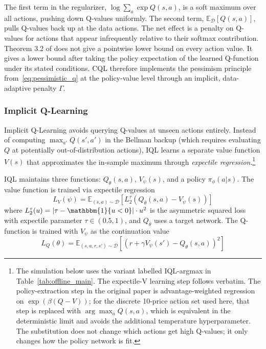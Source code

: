 The first term in the regularizer, $\log \sum_a \exp Q(s,a)$, is a soft maximum over all actions, pushing down Q-values uniformly. The second term, $\mathbb{E}_{\mathcal{D}}[Q(s,a)]$, pulls Q-values back up at the data actions. The net effect is a penalty on Q-values for actions that appear infrequently relative to their softmax contribution. Theorem 3.2 of \citet{Kumar2020} does not give a pointwise lower bound on every action value. It gives a lower bound after taking the policy expectation of the learned Q-function under its stated conditions. CQL therefore implements the pessimism principle from~\eqref{eq:pessimistic_q} at the policy-value level through an implicit, data-adaptive penalty $\Gamma$.

\subsubsection{Implicit Q-Learning}

Implicit Q-Learning \citep[IQL,][]{Kostrikov2022} avoids querying Q-values at unseen actions entirely. Instead of computing $\max_{a'} Q(s', a')$ in the Bellman backup (which requires evaluating $Q$ at potentially out-of-distribution actions), IQL learns a separate value function $V(s)$ that approximates the in-sample maximum through \textit{expectile regression}.\footnote{The simulation below uses the variant labelled IQL-argmax in Table~\ref{tab:offline_main}. The expectile-V learning step follows \citet{Kostrikov2022} verbatim. The policy-extraction step in the original paper is advantage-weighted regression on $\exp(\beta(Q-V))$; for the discrete 10-price action set used here, that step is replaced with $\arg\max_a Q(s,a)$, which is equivalent in the deterministic limit and avoids the additional temperature hyperparameter. The substitution does not change which actions get high Q-values; it only changes how the policy network is fit.}

\begin{definition}
\label{def:iql}
IQL maintains three functions: $Q_\theta(s,a)$, $V_\psi(s)$, and a policy $\pi_\phi(a|s)$. The value function is trained via expectile regression
\begin{equation}
\label{eq:iql_v}
L_V(\psi) = \mathbb{E}_{(s,a) \sim \mathcal{D}}\left[L_2^\tau(Q_{\bar{\theta}}(s,a) - V_\psi(s))\right]
\end{equation}
where $L_2^\tau(u) = |\tau - \mathbbm{1}\{u < 0\}| \cdot u^2$ is the asymmetric squared loss with expectile parameter $\tau \in (0.5, 1)$, and $Q_{\bar{\theta}}$ uses a target network. The Q-function is trained with $V_\psi$ as the continuation value
\begin{equation}
\label{eq:iql_q}
L_Q(\theta) = \mathbb{E}_{(s,a,r,s') \sim \mathcal{D}}\left[(r + \gamma V_\psi(s') - Q_\theta(s,a))^2\right]
\end{equation}
\end{definition}

